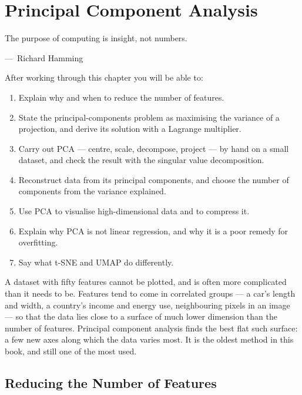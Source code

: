 
\chapter{Principal Component Analysis}
\label{ch:ch16}

\epigraph{The purpose of computing is insight, not numbers.}{---\ Richard Hamming}

\begin{chapterlearning}
After working through this chapter you will be able to:
\begin{enumerate}
  \item Explain why and when to reduce the number of features.
  \item State the principal-components problem as maximising the variance of a
        projection, and derive its solution with a Lagrange multiplier.
  \item Carry out PCA --- centre, scale, decompose, project --- by hand on a
        small dataset, and check the result with the singular value
        decomposition.
  \item Reconstruct data from its principal components, and choose the number of
        components from the variance explained.
  \item Use PCA to visualise high-dimensional data and to compress it.
  \item Explain why PCA is not linear regression, and why it is a poor remedy for
        overfitting.
  \item Say what t-SNE and UMAP do differently.
\end{enumerate}
\end{chapterlearning}

A dataset with fifty features cannot be plotted, and is often more complicated
than it needs to be. Features tend to come in correlated groups --- a car's length
and width, a country's income and energy use, neighbouring pixels in an image ---
so that the data lies close to a surface of much lower dimension than the number
of features. Principal component analysis finds the best flat such surface: a few
new axes along which the data varies most. It is the oldest method in this book,
and still one of the most used.

\section{Reducing the Number of Features}
\label{sec:reduce}

